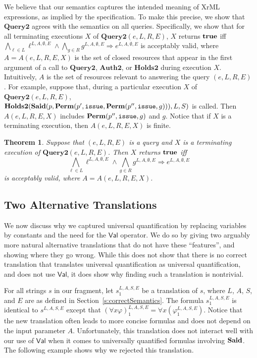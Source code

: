 \documentclass{acmtrans2m}
\newtheorem{theorem}{Theorem}[section]
\newcommand{\thm}{\begin{theorem}}
\newcommand{\ethm}{\end{theorem}}
\newcommand{\rimp}{\Rightarrow}
\newcommand{\<}{
}
\renewcommand{\>}{\rangle}
\renewcommand{\phi}{\varphi}
\newcommand{\Said}{\mathit{\bf Said}}
\newcommand{\true}{\mathit{\bf{true}}}
\newcommand{\Permitted}{\mathit{\bf Perm}}
\newcommand{\cc}{e}
\newcommand{\scc}{E}
\newcommand{\issue}{\mathtt{issue}}
\newcommand{\XProcTwo}{\textbf{Query2}}
\newcommand{\CMetTwo}{\textbf{Holds2}}
\newcommand{\XATwo}{\textbf{Auth2}}
\newcommand{\Val}{\mathsf{Val}}
\newcommand{\tranwithEempty}[1]{#1^{L, A, \emptyset, \scc}}
\newcommand{\EX}{X}
\begin{document}
\begin{sloppypar}
We believe that our semantics captures the intended meaning of XrML expressions, as implied by the
specification.  To make this precise, we show that $\XProcTwo$ agrees with the semantics on all queries.
Specifically, we show that for all terminating executions $\EX$ of $\XProcTwo(\cc, L, R, \scc)$, $\EX$
returns $\true$ iff $\bigwedge_{\ell\in L}\tranwithEempty{\ell}\land \bigwedge_{g\in R}\tranwithEempty{g}
\rimp\tranwithEempty{\cc}$ is acceptably valid, where $A = A(\cc, L, R, \scc, \EX)$ is the set of
closed resources that appear in the first argument of a call to $\XProcTwo$, $\XATwo$, or $\CMetTwo$
during execution $\EX$.  Intuitively, $A$ is the set of resources relevant to answering the query
$(\cc, L, R, \scc)$.  For example, suppose that, during a particular execution $\EX$ of
$\XProcTwo(\cc, L, R, \scc)$,
$\CMetTwo(\Said(p, \Permitted(p', \issue, \Permitted(p'', \issue, g))), L, S)$ is called.  Then
$A(\cc, L, R, \scc, \EX)$ includes $\Permitted(p'', \issue, g)$ and $g$.  Notice that if $\EX$ is a
terminating execution, then $A(\cc, L, R, \scc, \EX)$ is finite.
\thm\label{t:correct1}
Suppose that $(\cc, L, R, \scc)$ is a query and $\EX$ is a terminating execution of
$\XProcTwo(\cc, L, R, \scc)$.  Then $\EX$ returns $\true$ iff
$$
\bigwedge_{\ell\in L}\tranwithEempty{\ell}\land \bigwedge_{g\in R}\tranwithEempty{g}\rimp
\tranwithEempty{\cc}
$$
is acceptably valid, where $A = A(\cc, L, R, \scc, \EX)$.
\ethm
\end{sloppypar}
\subsection{Two Alternative Translations}\label{s:temptingTrans}
We now discuss why we captured universal quantification by replacing
variables by constants and the need for the $\Val$ operator.  We do so
by giving two arguably more natural alternative translations that do not
have these ``features'', and showing where they go wrong.  While this
does not show that there is no correct translation that translates
universal quantification as universal quantification, and does not use
$\Val$, it does show why finding such a translation
is nontrivial.

For all strings $s$ in our fragment, let $s^{L, A, S, E}_1$ be a
translation of $s$, where $L$, $A$,
$S$, and $E$ are as defined in Section~\ref{s:correctSemantics}.  The
formula $s^{L, A, S, E}_1$ is 
identical to $s^{L, A, S, E}$ except that
$(\forall x \phi)^{L, A, S, E}_1 = \forall x(\phi^{L, A, S, E}_1)$.
Notice that the new translation often leads to more concise formulas and
does not depend on the input 
parameter $A$.  
Unfortunately, this translation does not interact well with our use of
$\Val$ when it comes to universally quantified formulas involving
$\Said$.
The following example shows
why we rejected this translation.
\end{document}
